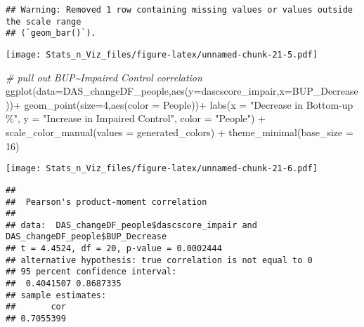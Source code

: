 \documentclass[
]{article}
\newenvironment{Shaded}{\begin{snugshade}}{\end{snugshade}}
\newcommand{\AttributeTok}[1]{\textcolor[rgb]{0.77,0.63,0.00}{#1}}
\newcommand{\CommentTok}[1]{\textcolor[rgb]{0.56,0.35,0.01}{\textit{#1}}}
\newcommand{\DecValTok}[1]{\textcolor[rgb]{0.00,0.00,0.81}{#1}}
\newcommand{\FunctionTok}[1]{\textcolor[rgb]{0.00,0.00,0.00}{#1}}
\newcommand{\NormalTok}[1]{#1}
\newcommand{\SpecialCharTok}[1]{\textcolor[rgb]{0.00,0.00,0.00}{#1}}
\newcommand{\StringTok}[1]{\textcolor[rgb]{0.31,0.60,0.02}{#1}}
\begin{document}
\begin{verbatim}
## Warning: Removed 1 row containing missing values or values outside the scale range
## (`geom_bar()`).
\end{verbatim}

\texttt{[image: Stats\_n\_Viz\_files/figure-latex/unnamed-chunk-21-5.pdf]}

\begin{Shaded}
\begin{Highlighting}[]
\CommentTok{\# pull out BUP\textasciitilde{}Impaired Control correlation}
\FunctionTok{ggplot}\NormalTok{(}\AttributeTok{data=}\NormalTok{DAS\_changeDF\_people,}\FunctionTok{aes}\NormalTok{(}\AttributeTok{y=}\NormalTok{dascscore\_impair,}\AttributeTok{x=}\NormalTok{BUP\_Decrease))}\SpecialCharTok{+}
  \FunctionTok{geom\_point}\NormalTok{(}\AttributeTok{size=}\DecValTok{4}\NormalTok{,}\FunctionTok{aes}\NormalTok{(}\AttributeTok{color =}\NormalTok{ People))}\SpecialCharTok{+}
  \FunctionTok{labs}\NormalTok{(}\AttributeTok{x =} \StringTok{"Decrease in Bottom{-}up \%"}\NormalTok{, }\AttributeTok{y =} \StringTok{"Increase in Impaired Control"}\NormalTok{, }\AttributeTok{color =} \StringTok{"People"}\NormalTok{) }\SpecialCharTok{+}
  \FunctionTok{scale\_color\_manual}\NormalTok{(}\AttributeTok{values =}\NormalTok{ generated\_colors) }\SpecialCharTok{+}
  \FunctionTok{theme\_minimal}\NormalTok{(}\AttributeTok{base\_size =} \DecValTok{16}\NormalTok{)}
\end{Highlighting}
\end{Shaded}

\texttt{[image: Stats\_n\_Viz\_files/figure-latex/unnamed-chunk-21-6.pdf]}

\begin{Shaded}
\end{Shaded}

\begin{verbatim}
## 
##  Pearson's product-moment correlation
## 
## data:  DAS_changeDF_people$dascscore_impair and DAS_changeDF_people$BUP_Decrease
## t = 4.4524, df = 20, p-value = 0.0002444
## alternative hypothesis: true correlation is not equal to 0
## 95 percent confidence interval:
##  0.4041507 0.8687335
## sample estimates:
##       cor 
## 0.7055399
\end{verbatim}
\end{document}
